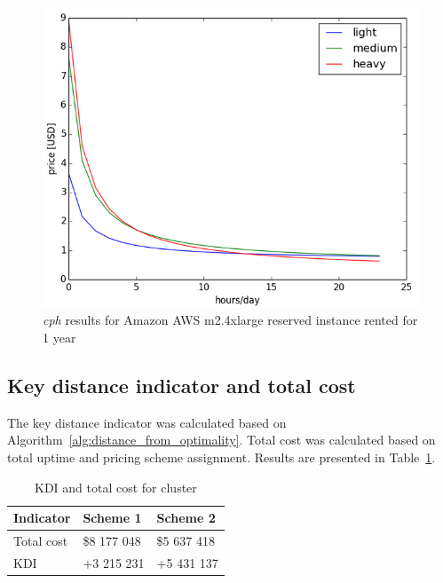 \documentclass[]{final_report}
\begin{document}
\begin{figure}[H]
  \includegraphics[width=\linewidth]{figures/m2_4xlarge}
  \caption{\textit{cph} results for Amazon AWS m2.4xlarge reserved instance rented for 1 year~\cite{AWS:light}~\cite{AWS:medium}~\cite{AWS:heavy}}
  \label{fig:m2_4xlarge}
\end{figure}

\subsection{Key distance indicator and total cost}

The key distance indicator was calculated based on Algorithm~\ref{alg:distance_from_optimality}. 
Total cost was calculated based on total uptime and pricing scheme assignment. Results are presented in Table~\ref{tab:kdi_and_cost}.

\begin{table}[h]
\begin{center}
    \begin{tabular}{| l | l | l |}
    \hline
    \textbf{Indicator} & \textbf{Scheme 1} & \textbf{Scheme 2} \\
    \hline
    Total cost & \$8 177 048 & \$5 637 418 \\
    \hline
    KDI & +3 215 231 & +5 431 137 \\
    \hline
    \end{tabular}
\end{center}
\caption{KDI and total cost for cluster}
\label{tab:kdi_and_cost}
\end{table}
\end{document}

